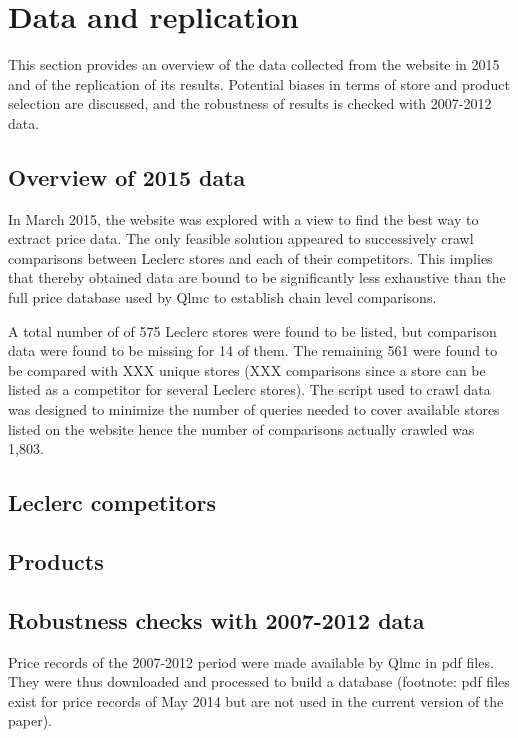 \documentclass[11pt]{article}
\begin{document}
\section{Data and replication}

This section provides an overview of the data collected from the website in 2015 and of the replication of its results. Potential biases in terms of store and product selection are discussed, and the robustness of results is checked with 2007-2012 data.

\subsection{Overview of 2015 data}

In March 2015, the website was explored with a view to find the best way to extract price data. The only feasible solution appeared to successively crawl comparisons between Leclerc stores and each of their competitors. This implies that thereby obtained data are bound to be significantly less exhaustive than the full price database used by Qlmc to establish chain level comparisons.

A total number of of 575 Leclerc stores were found to be listed, but comparison data were found to be missing for 14 of them. The remaining 561 were found to be compared with XXX unique stores (XXX comparisons since a store can be listed as a competitor for several Leclerc stores). The script used to crawl data was designed to minimize the number of queries needed to cover available stores listed on the website hence the number of comparisons actually crawled was 1,803.

\subsection{Leclerc competitors}

\subsection{Products}

\subsection{Robustness checks with 2007-2012 data}

Price records of the 2007-2012 period were made available by Qlmc in pdf files. They were thus downloaded and processed to build a database (footnote: pdf files exist for price records of May 2014 but are not used in the current version of the paper).
\end{document}
